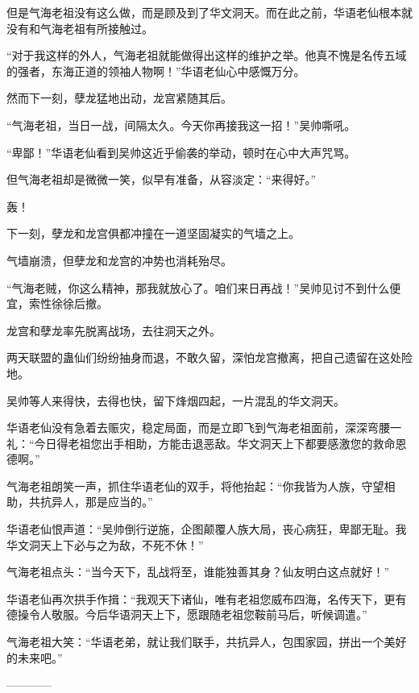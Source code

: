 \begin{this_body}
但是气海老祖没有这么做，而是顾及到了华文洞天。而在此之前，华语老仙根本就没有和气海老祖有所接触过。

“对于我这样的外人，气海老祖就能做得出这样的维护之举。他真不愧是名传五域的强者，东海正道的领袖人物啊！”华语老仙心中感慨万分。

然而下一刻，孽龙猛地出动，龙宫紧随其后。

“气海老祖，当日一战，间隔太久。今天你再接我这一招！”吴帅嘶吼。

“卑鄙！”华语老仙看到吴帅这近乎偷袭的举动，顿时在心中大声咒骂。

但气海老祖却是微微一笑，似早有准备，从容淡定：“来得好。”

轰！

下一刻，孽龙和龙宫俱都冲撞在一道坚固凝实的气墙之上。

气墙崩溃，但孽龙和龙宫的冲势也消耗殆尽。

“气海老贼，你这么精神，那我就放心了。咱们来日再战！”吴帅见讨不到什么便宜，索性徐徐后撤。

龙宫和孽龙率先脱离战场，去往洞天之外。

两天联盟的蛊仙们纷纷抽身而退，不敢久留，深怕龙宫撤离，把自己遗留在这处险地。

吴帅等人来得快，去得也快，留下烽烟四起，一片混乱的华文洞天。

华语老仙没有急着去赈灾，稳定局面，而是立即飞到气海老祖面前，深深弯腰一礼：“今日得老祖您出手相助，方能击退恶敌。华文洞天上下都要感激您的救命恩德啊。”

气海老祖朗笑一声，抓住华语老仙的双手，将他抬起：“你我皆为人族，守望相助，共抗异人，那是应当的。”

华语老仙恨声道：“吴帅倒行逆施，企图颠覆人族大局，丧心病狂，卑鄙无耻。我华文洞天上下必与之为敌，不死不休！”

气海老祖点头：“当今天下，乱战将至，谁能独善其身？仙友明白这点就好！”

华语老仙再次拱手作揖：“我观天下诸仙，唯有老祖您威布四海，名传天下，更有德操令人敬服。今后华语洞天上下，愿跟随老祖您鞍前马后，听候调遣。”

气海老祖大笑：“华语老弟，就让我们联手，共抗异人，包围家园，拼出一个美好的未来吧。”

------------

\end{this_body}

